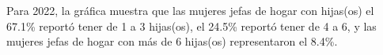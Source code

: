 Para 2022, la gráfica muestra que las mujeres jefas de hogar con hijas(os) el 67.1\% reportó tener de 1 a 3 hijas(os), el 24.5\% reportó tener de 4 a 6, y las mujeres jefas de hogar con más de 6 hijas(os) representaron el 8.4\%. 